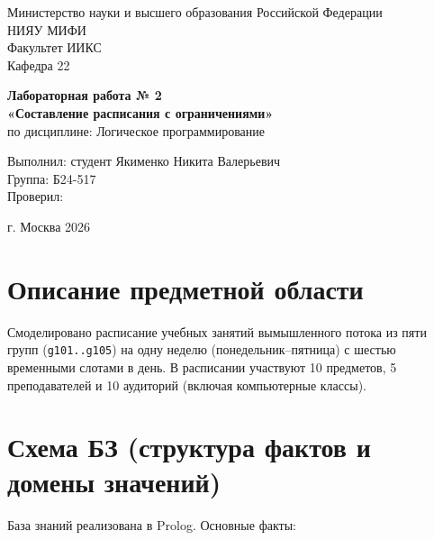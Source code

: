 \documentclass[14pt,a4paper]{extarticle}
\begin{document}
\begin{titlepage}
\begin{center}
Министерство науки и высшего образования Российской Федерации\\
НИЯУ МИФИ\\
Факультет ИИКС\\
Кафедра 22
\end{center}

\vfill

\begin{center}
\textbf{Лабораторная работа № 2}\\
\textbf{«Составление расписания с ограничениями»}\\
по дисциплине: Логическое программирование
\end{center}

\vfill

\begin{flushright}
Выполнил: студент Якименко Никита Валерьевич\\
Группа: Б24-517\\
Проверил: \underline{\hspace{6cm}}
\end{flushright}

\vfill

\begin{center}
г. Москва \hspace{1cm} 2026
\end{center}
\end{titlepage}

\tableofcontents
\newpage

\section{Описание предметной области}
Смоделировано расписание учебных занятий вымышленного потока из пяти групп
(\texttt{g101..g105}) на одну неделю (понедельник--пятница) с шестью временными
слотами в день. В расписании участвуют 10 предметов, 5 преподавателей и 10
аудиторий (включая компьютерные классы).

\section{Схема БЗ (структура фактов и домены значений)}
База знаний реализована в Prolog. Основные факты:
\end{document}
